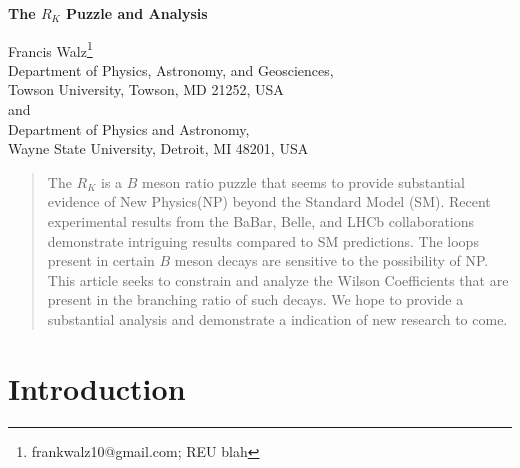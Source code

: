 \documentclass[12pt]{article}
\begin{document}
    \begin{center}
        \vspace*{1cm}
        
        \Huge
        \textbf{The $R_K$ Puzzle and Analysis}
        
        \vskip 20pt
        
        \large{Francis Walz}\footnote{frankwalz10@gmail.com; REU blah}\\ Department of Physics, Astronomy, and Geosciences, \\ Towson University, Towson, MD 21252, USA \\
          and \\
        Department of Physics and Astronomy, \\ Wayne State University, Detroit, MI 48201, USA
        
        \begin{abstract}
        The $R_K$ is a $B$ meson ratio puzzle that seems to provide substantial evidence of New Physics(NP) beyond the Standard Model (SM). Recent experimental results from the BaBar, Belle, and LHCb collaborations demonstrate intriguing results compared to SM predictions. The loops present in certain $B$ meson decays are sensitive to the possibility of NP. This article seeks to constrain and analyze the Wilson Coefficients that are present in the branching ratio of such decays. We hope to provide a substantial analysis and demonstrate a indication of new research to come.  
        \end{abstract}
        \vfill
    \end{center}
    
\tableofcontents

\section{Introduction}
\end{document}
